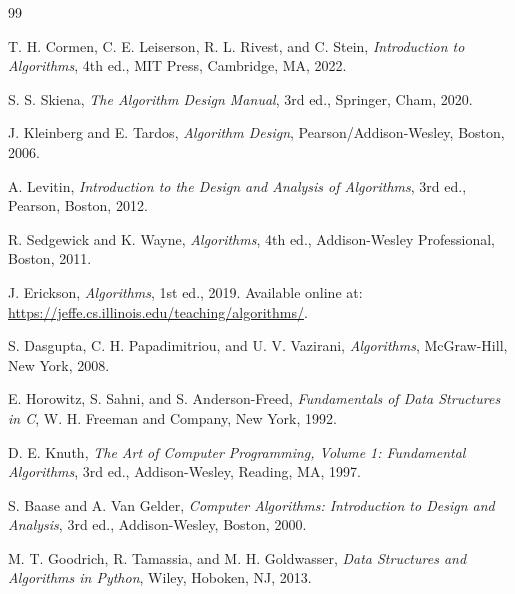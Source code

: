 \documentclass[b5paper, utf8, 11pt, colorlinks]{book}
\begin{document}


\backmatter
\begin{thebibliography}{99}
	
	
	T. H. Cormen, C. E. Leiserson, R. L. Rivest, and C. Stein,
	\textit{Introduction to Algorithms},
	4th ed.,
	MIT Press, Cambridge, MA, 2022.
	
	S. S. Skiena,
	\textit{The Algorithm Design Manual},
	3rd ed.,
	Springer, Cham, 2020.
	
	J. Kleinberg and E. Tardos,
	\textit{Algorithm Design},
	Pearson/Addison-Wesley, Boston, 2006.
	
	A. Levitin,
	\textit{Introduction to the Design and Analysis of Algorithms},
	3rd ed.,
	Pearson, Boston, 2012.
	
	R. Sedgewick and K. Wayne,
	\textit{Algorithms},
	4th ed.,
	Addison-Wesley Professional, Boston, 2011.
	
	J. Erickson,
	\textit{Algorithms},
	1st ed.,
	2019.
	Available online at:
	\url{https://jeffe.cs.illinois.edu/teaching/algorithms/}.
	
	S. Dasgupta, C. H. Papadimitriou, and U. V. Vazirani,
	\textit{Algorithms},
	McGraw-Hill, New York, 2008.
	
	E. Horowitz, S. Sahni, and S. Anderson-Freed,
	\textit{Fundamentals of Data Structures in C},
	W. H. Freeman and Company, New York, 1992.
	
	D. E. Knuth,
	\textit{The Art of Computer Programming, Volume 1:
		Fundamental Algorithms},
	3rd ed.,
	Addison-Wesley, Reading, MA, 1997.
	
	
	S. Baase and A. Van Gelder,
	\textit{Computer Algorithms: Introduction to Design and Analysis},
	3rd ed.,
	Addison-Wesley, Boston, 2000.
	
	M. T. Goodrich, R. Tamassia, and M. H. Goldwasser,
	\textit{Data Structures and Algorithms in Python},
	Wiley, Hoboken, NJ, 2013.
	

\end{thebibliography}
\end{document}
